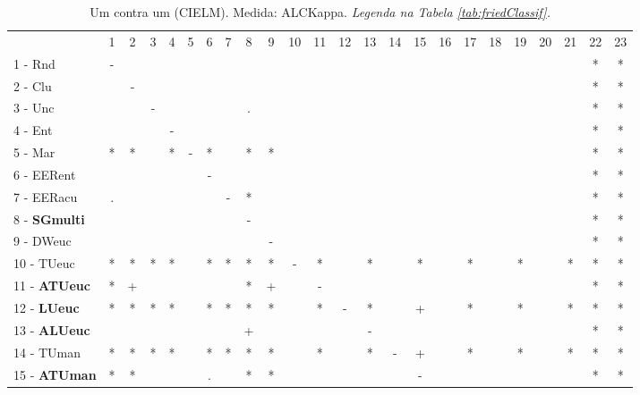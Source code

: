 \begin{table}[h]
\caption{Um contra um (CIELM). Medida: ALCKappa. \textit{Legenda na Tabela \ref{tab:friedClassif}.}}
\begin{center}\begin{tabular}{lcc|cc|cc|cc|cc|cc|cc|cc|cc|cc|cc|c}
 			& 1 & 2 & 3 & 4 & 5 & 6 & 7 & 8 & 9 & 10 & 11 & 12 & 13 & 14 & 15 & 16 & 17 & 18 & 19 & 20 & 21 & 22 & 23\\
1 - Rnd  	& - &   &   &   &   &   &   &   &   &   &   &   &   &   &   &   &   &   &   &   &   & * & * \\
2 - Clu  	&   & - &   &   &   &   &   &   &   &   &   &   &   &   &   &   &   &   &   &   &   & * & * \\ \hline
3 - Unc  	&   &   & - &   &   &   &   & . &   &   &   &   &   &   &   &   &   &   &   &   &   & * & * \\
4 - Ent  	&   &   &   & - &   &   &   &   &   &   &   &   &   &   &   &   &   &   &   &   &   & * & * \\ \hline
5 - Mar  	& * & * &   & * & - & * &   & * & * &   &   &   &   &   &   &   &   &   &   &   &   & * & * \\
6 - EERent	&   &   &   &   &   & - &   &   &   &   &   &   &   &   &   &   &   &   &   &   &   & * & * \\ \hline
7 - EERacu	& . &   &   &   &   &   & - & * &   &   &   &   &   &   &   &   &   &   &   &   &   & * & * \\
8 - \textbf{SGmulti}	&   &   &   &   &   &   &   & - &   &   &   &   &   &   &   &   &   &   &   &   &   & * & * \\ \hline
9 - DWeuc	&   &   &   &   &   &   &   &   & - &   &   &   &   &   &   &   &   &   &   &   &   & * & * \\
10 - TUeuc	& * & * & * & * &   & * & * & * & * & - & * &   & * &   & * &   & * &   & * &   & * & * & * \\ \hline
11 - \textbf{ATUeuc}	& * & + &   &   &   &   &   & * & + &   & - &   &   &   &   &   &   &   &   &   &   & * & * \\
12 - \textbf{LUeuc}	& * & * & * & * &   & * & * & * & * &   & * & - & * &   & + &   & * &   & * &   & * & * & * \\ \hline
13 - \textbf{ALUeuc}	&   &   &   &   &   &   &   & + &   &   &   &   & - &   &   &   &   &   &   &   &   & * & * \\
14 - TUman	& * & * & * & * &   & * & * & * & * &   & * &   & * & - & + &   & * &   & * &   & * & * & * \\ \hline
15 - \textbf{ATUman}	& * & * &   &   &   & . &   & * & * &   &   &   &   &   & - &   &   &   &   &   &   & * & * \\

\end{tabular}
\end{center}
\end{table}

